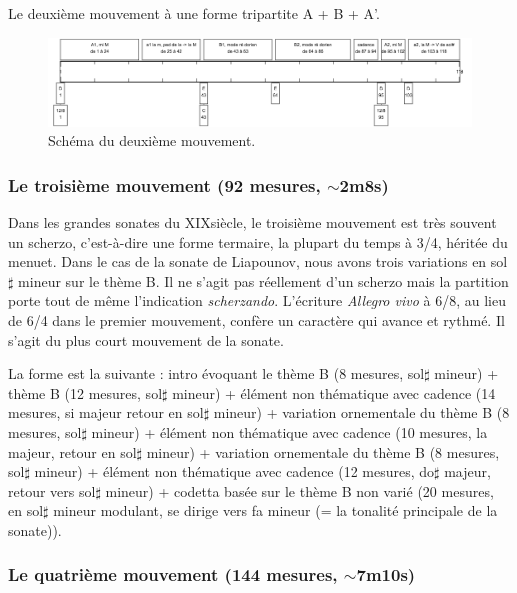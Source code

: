 Le deuxième mouvement à une forme tripartite A + B + A'.

\begin{figure}[!ht]
  \begin{bigcenter}
    \includegraphics[width=15cm, keepaspectratio]{frise-mvt2.png}
  \end{bigcenter}
  \caption{\label{schema-2}Schéma du deuxième mouvement.}
\end{figure}

\subsubsection*{Le troisième mouvement (92 mesures, $\sim$2m8s)}

Dans les grandes sonates du XIX\ieme siècle, le troisième mouvement est très souvent un scherzo, c'est-à-dire une forme termaire, la plupart du temps à 3/4, héritée du menuet. Dans le cas de la sonate de Liapounov, nous avons trois variations en sol$\sharp$ mineur sur le thème B. Il ne s'agit pas réellement d'un scherzo mais la partition porte tout de même l'indication \emph{scherzando}. L'écriture \emph{Allegro vivo} à 6/8, au lieu de 6/4 dans le premier mouvement, confère un caractère qui avance et rythmé. Il s'agit du plus court mouvement de la sonate.

La forme est la suivante : intro évoquant le thème B (8 mesures, sol$\sharp$ mineur) + thème B (12 mesures, sol$\sharp$ mineur) + élément non thématique avec cadence (14 mesures, si majeur retour en sol$\sharp$ mineur) + variation ornementale du thème B (8 mesures, sol$\sharp$ mineur) + élément non thématique avec cadence (10 mesures, la majeur, retour en sol$\sharp$ mineur) + variation ornementale du thème B (8 mesures, sol$\sharp$ mineur) + élément non thématique avec cadence (12 mesures, do$\sharp$ majeur, retour vers sol$\sharp$ mineur) + codetta basée sur le thème B non varié (20 mesures, en sol$\sharp$ mineur modulant, se dirige vers fa mineur (= la tonalité principale de la sonate)).

\subsubsection*{Le quatrième mouvement (144 mesures, $\sim$7m10s)}

